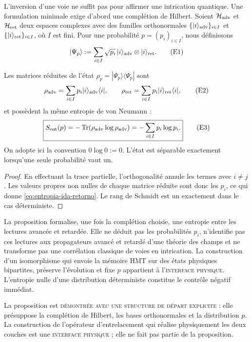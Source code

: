 L'inversion d'une voie ne suffit pas pour affirmer une intrication quantique. Une
formulation minimale exige d'abord une complétion de Hilbert. Soient
\(\mathcal H_{\rm adv}\) et \(\mathcal H_{\rm ret}\) deux espaces complexes
avec des familles orthonormales
\(\{|i\rangle_{\rm adv}\}_{i\in I}\) et
\(\{|i\rangle_{\rm ret}\}_{i\in I}\), où \(I\) est fini. Pour une
probabilité \(p=(p_i)_{i\in I}\), nous définissons
\[
 |\Psi_p\rangle
 :=\sum_{i\in I}\sqrt{p_i}\,
 |i\rangle_{\rm adv}\otimes|i\rangle_{\rm ret}.
 \tag{E1}\label{eq:estado-entrelazado-ida-retorno}
\]

\begin{proposition}
\label{prop:entropia-entrelazamiento-ida-retorno}
Les matrices réduites de l'état
\(\rho_p=|\Psi_p\rangle\langle\Psi_p|\) sont
\[
 \rho_{\rm adv}
 =\sum_{i\in I}p_i|i\rangle_{\rm adv}\langle i|,
 \qquad
 \rho_{\rm ret}
 =\sum_{i\in I}p_i|i\rangle_{\rm ret}\langle i|,
 \tag{E2}\label{eq:reducidas-ida-retorno}
\]
et possèdent la même entropie de von Neumann :
\[
 \boxed{
 S_{\rm ent}(p)
 =-\operatorname{Tr}(\rho_{\rm adv}\log\rho_{\rm adv})
 =-\sum_{i\in I}p_i\log p_i.}
 \tag{E3}\label{eq:entropia-ida-retorno}
\]
On adopte ici la convention \(0\log0:=0\). L'état est séparable
exactement lorsqu'une seule probabilité vaut un.
\end{proposition}

\begin{proof}
En effectuant la trace partielle, l'orthogonalité annule les termes avec
\(i\ne j\). Les valeurs propres non nulles de chaque matrice réduite sont donc
les \(p_i\), ce qui donne \eqref{eq:entropia-ida-retorno}. Le rang de
Schmidt est un exactement dans le cas déterministe.
\end{proof}

La proposition formalise, une fois la complétion choisie, une entropie entre
les lectures avancée et retardée. Elle ne déduit pas les probabilités \(p_i\),
n'identifie pas ces lectures aux propagateurs avancé et retardé d'une
théorie des champs et ne transforme pas une corrélation classique de voies en
intrication. La construction d'un isomorphisme qui envoie la mémoire HMT
sur des états physiques bipartites, préserve l'évolution et fixe \(p\) appartient à
l'\textsc{interface physique}. L'entropie nulle d'une distribution
déterministe constitue le contrôle négatif immédiat.

\begin{statusbox}
La proposition est
\textsc{démontrée avec une structure de départ explicite} : elle présuppose la
complétion de Hilbert, les bases orthonormales et la distribution \(p\). La construction
de l'opérateur d'entrelacement qui réalise physiquement les deux couches est une
\textsc{interface physique} ; elle ne fait pas partie de la proposition.
\end{statusbox}

